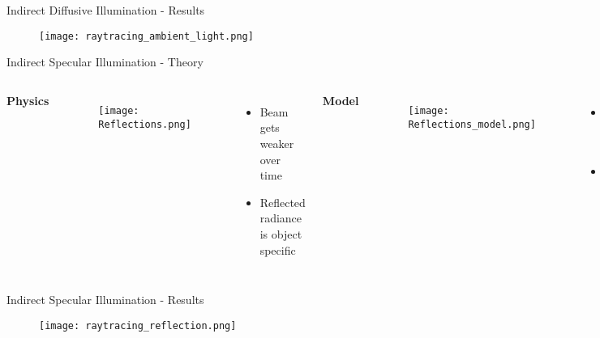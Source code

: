     \begin{frame}{Indirect Diffusive Illumination - Results}
        \begin{figure}
            \centering
            \texttt{[image: raytracing\_ambient\_light.png]}
        \end{figure}  
    \end{frame}


    \begin{frame}{Indirect Specular Illumination - Theory}
        \begin{columns}[T]
            \textbf{Physics}
            
            \begin{figure}
                \centering
                \texttt{[image: Reflections.png]}
            \end{figure}
            
            \pause
            \begin{itemize}
                \item Beam gets weaker over time
                \pause
                \item Reflected radiance is object specific
            \end{itemize}
            
            \textbf{Model}

            \pause
            \begin{figure}
                \centering
                \texttt{[image: Reflections\_model.png]}
            \end{figure}

            \pause
            \begin{itemize}
                \item Maximum reflection depth
                \pause
                \item Object specific reflection coefficient
            \end{itemize}

            \pause
            \begin{equation*}
                \text{Pixel} = (L_d + L_0) \cdot \text{Color} + c_r \cdot L_r
            \end{equation*}
        \end{columns}
    \end{frame}

    \begin{frame}{Indirect Specular Illumination - Results}
        \begin{figure}
            \centering
            \texttt{[image: raytracing\_reflection.png]}
        \end{figure}
    \end{frame}